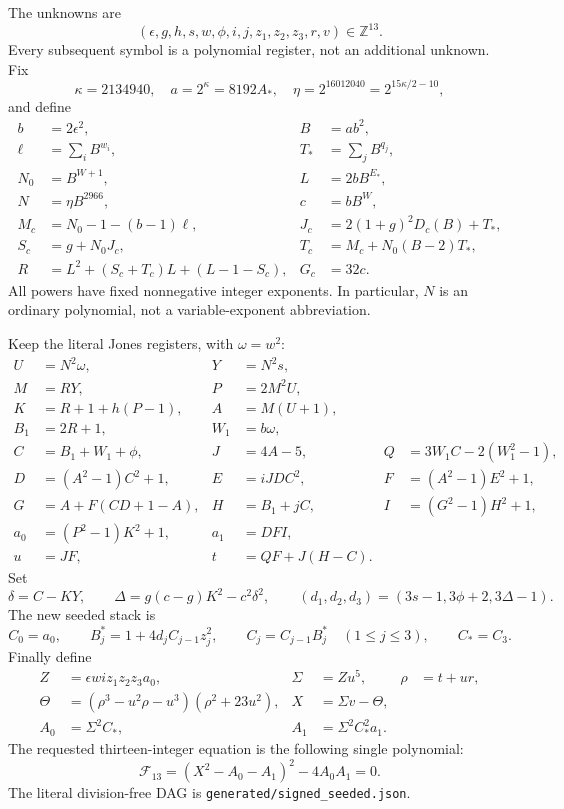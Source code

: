 The unknowns are
\[
 (\epsilon,g,h,s,w,\phi,i,j,z_1,z_2,z_3,r,v)\in\mathbb Z^{13}.
\]
Every subsequent symbol is a polynomial register, not an additional unknown.
Fix
\[
 \kappa=2134940,\quad a=2^\kappa=8192A_*,\quad
 \eta=2^{16012040}=2^{15\kappa/2-10},
\]
and define
\begin{align*}
 b&=2\epsilon^2,& B&=ab^2,\\
 \ell&=\sum_iB^{w_i},& T_*&=\sum_jB^{q_j},\\
 N_0&=B^{W+1},& L&=2bB^{E_*},\\
 N&=\eta B^{2966},& c&=bB^W,\\
 M_c&=N_0-1-(b-1)\ell,&
 J_c&=2(1+g)^2D_c(B)+T_*,\\
 S_c&=g+N_0J_c,& T_c&=M_c+N_0(B-2)T_*,\\
 R&=L^2+(S_c+T_c)L+(L-1-S_c),& G_c&=32c.
\end{align*}
All powers have fixed nonnegative integer exponents. In particular, $N$ is
an ordinary polynomial, not a variable-exponent abbreviation.

Keep the literal Jones registers, with $\omega=w^2$:
\begin{align*}
 U&=N^2\omega,&Y&=N^2s,\\
 M&=RY,&P&=2M^2U,\\
 K&=R+1+h(P-1),&A&=M(U+1),\\
 B_1&=2R+1,&W_1&=b\omega,\\
 C&=B_1+W_1+\phi,&J&=4A-5,&
 Q&=3W_1C-2(W_1^2-1),\\
 D&=(A^2-1)C^2+1,&E&=iJDC^2,&F&=(A^2-1)E^2+1,\\
 G&=A+F(CD+1-A),&H&=B_1+jC,&I&=(G^2-1)H^2+1,\\
 a_0&=(P^2-1)K^2+1,&a_1&=DFI,\\
 u&=JF,&t&=QF+J(H-C).
\end{align*}
Set
\[
 \delta=C-KY,\qquad \Delta=g(c-g)K^2-c^2\delta^2,
 \qquad (d_1,d_2,d_3)=(3s-1,3\phi+2,3\Delta-1).
\]
The new seeded stack is
\[
 C_0=a_0,\qquad B_j^*=1+4d_jC_{j-1}z_j^2,\qquad
 C_j=C_{j-1}B_j^*\quad(1\le j\le3),\qquad C_*=C_3.
\]
Finally define
\begin{align*}
 Z&=\epsilon wi z_1z_2z_3a_0,&\Sigma&=Zu^5,&\rho&=t+ur,\\
 \Theta&=(\rho^3-u^2\rho-u^3)(\rho^2+23u^2),&
 X&=\Sigma v-\Theta,\\
 A_0&=\Sigma^2C_*,&A_1&=\Sigma^2C_*^2a_1.
\end{align*}
The requested thirteen-integer equation is the following single polynomial:
\begin{equation}\label{eq:jones-seeded}
 \boxed{\mathcal F_{13}=(X^2-A_0-A_1)^2-4A_0A_1=0.}
\end{equation}
The literal division-free DAG is \texttt{generated/signed\_seeded.json}.

